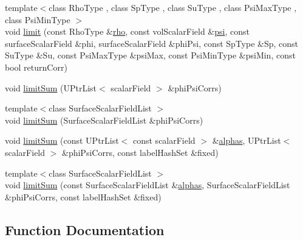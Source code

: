 \begin{DoxyCompactItemize}
\item 
{\footnotesize template$<$class Rho\+Type , class Sp\+Type , class Su\+Type , class Psi\+Max\+Type , class Psi\+Min\+Type $>$ }\\void \hyperlink{namespaceFoam_1_1myMULES_a6a4ca7f89dcf27e552f89e4a73d5a57c}{limit} (const Rho\+Type \&\hyperlink{EEqn__1pl_8H_ac955f87ac2b79f02f420cae087fc52b1}{rho}, const vol\+Scalar\+Field \&\hyperlink{UEqn__1pl_8H_a165a34deec3ee505598e511a88831968}{psi}, const surface\+Scalar\+Field \&phi, surface\+Scalar\+Field \&phi\+Psi, const Sp\+Type \&Sp, const Su\+Type \&Su, const Psi\+Max\+Type \&psi\+Max, const Psi\+Min\+Type \&psi\+Min, const bool return\+Corr)
\item 
void \hyperlink{namespaceFoam_1_1myMULES_aaae3018ee0507861d4bc922ead356165}{limit\+Sum} (U\+Ptr\+List$<$ scalar\+Field $>$ \&phi\+Psi\+Corrs)
\item 
{\footnotesize template$<$class Surface\+Scalar\+Field\+List $>$ }\\void \hyperlink{namespaceFoam_1_1myMULES_a2a6599c8010c73aee2d272c630310a15}{limit\+Sum} (Surface\+Scalar\+Field\+List \&phi\+Psi\+Corrs)
\item 
void \hyperlink{namespaceFoam_1_1myMULES_a108da011c64c47c3247e56b83467ac34}{limit\+Sum} (const U\+Ptr\+List$<$ const scalar\+Field $>$ \&\hyperlink{alphaEqns__2p_8H_a2cbad8ea5beaa4a82b823322537d5a70}{alphas}, U\+Ptr\+List$<$ scalar\+Field $>$ \&phi\+Psi\+Corrs, const label\+Hash\+Set \&fixed)
\item 
{\footnotesize template$<$class Surface\+Scalar\+Field\+List $>$ }\\void \hyperlink{namespaceFoam_1_1myMULES_a25814ac88176fe3afac0fa3eb2a1f90c}{limit\+Sum} (const Surface\+Scalar\+Field\+List \&\hyperlink{alphaEqns__2p_8H_a2cbad8ea5beaa4a82b823322537d5a70}{alphas}, Surface\+Scalar\+Field\+List \&phi\+Psi\+Corrs, const label\+Hash\+Set \&fixed)
\end{DoxyCompactItemize}


\subsection{Function Documentation}
\mbox{\label{namespaceFoam_1_1myMULES_a62d251545cddb4d8e55512c4a86dcabf}} 
